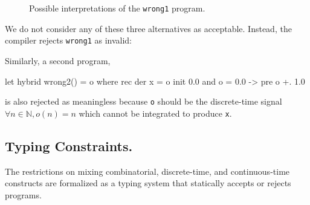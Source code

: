 \documentclass[11pt,titlepage,twoside]{report}
\makeatletter
\newcommand{\zls}[1]{{\@span{class="zelusinline"}#1}}
\newcommand{\zls}[1]{\texttt{#1}}
\renewcommand{\zls}[1]{\texttt{#1}}
\newcommand{\bN}{\mathbb{N}}
\makeatother
\begin{document}
\begin{figure}
\caption{Possible interpretations of the \zls{wrong1} 
program.\label{wrong1interp}}
\end{figure}

\noindent
We do not consider any of these three alternatives as acceptable.
Instead, the compiler rejects \zls{wrong1} as invalid: \chklistingerr{}

Similarly, a second program,
\begin{chklisting}[fail]
let hybrid wrong2() = o where
  rec der x = o init 0.0
  and o = 0.0 -> pre o +. 1.0
\end{chklisting}
is also rejected as meaningless because \zls{o} should be the discrete-time 
signal $\forall n \in \bN, o(n) = n$ which cannot be integrated to produce 
\zls{x}.

\subsection{Typing Constraints.} %

The restrictions on mixing combinatorial, discrete-time, and continuous-time 
constructs are formalized as a typing system that statically accepts or 
rejects programs.
\end{document}
